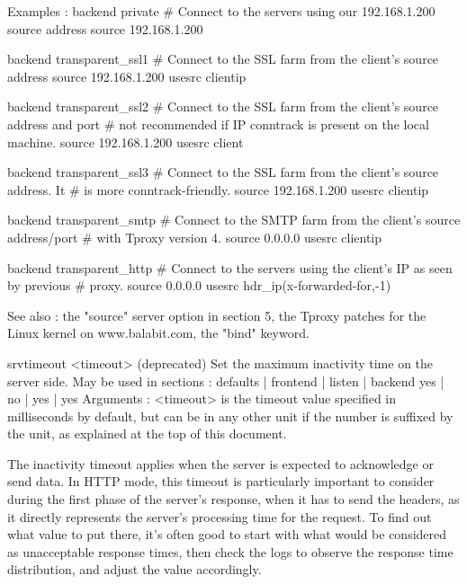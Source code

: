   Examples :
        backend private
            # Connect to the servers using our 192.168.1.200 source address
            source 192.168.1.200

        backend transparent_ssl1
            # Connect to the SSL farm from the client's source address
            source 192.168.1.200 usesrc clientip

        backend transparent_ssl2
            # Connect to the SSL farm from the client's source address and port
            # not recommended if IP conntrack is present on the local machine.
            source 192.168.1.200 usesrc client

        backend transparent_ssl3
            # Connect to the SSL farm from the client's source address. It
            # is more conntrack-friendly.
            source 192.168.1.200 usesrc clientip

        backend transparent_smtp
            # Connect to the SMTP farm from the client's source address/port
            # with Tproxy version 4.
            source 0.0.0.0 usesrc clientip

        backend transparent_http
            # Connect to the servers using the client's IP as seen by previous
            # proxy.
            source 0.0.0.0 usesrc hdr_ip(x-forwarded-for,-1)

  See also : the "source" server option in section 5, the Tproxy patches for
             the Linux kernel on www.balabit.com, the "bind" keyword.


srvtimeout <timeout> (deprecated)
  Set the maximum inactivity time on the server side.
  May be used in sections :   defaults | frontend | listen | backend
                                 yes   |    no    |   yes  |   yes
  Arguments :
    <timeout> is the timeout value specified in milliseconds by default, but
              can be in any other unit if the number is suffixed by the unit,
              as explained at the top of this document.

  The inactivity timeout applies when the server is expected to acknowledge or
  send data. In HTTP mode, this timeout is particularly important to consider
  during the first phase of the server's response, when it has to send the
  headers, as it directly represents the server's processing time for the
  request. To find out what value to put there, it's often good to start with
  what would be considered as unacceptable response times, then check the logs
  to observe the response time distribution, and adjust the value accordingly.


